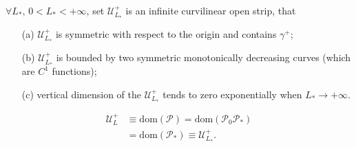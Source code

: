 \documentclass [10pt] {beamer}
\begin{document}
\begin{frame}
\begin{columns}[T]
\begin{column}{.5\textwidth}
			\begin{theorem}
				$\forall L_*, \, 0 < L_* < +\infty$, set $\mathscr{U}_{L_*}^+$ is an infinite curvilinear open strip, that
				\begin{enumerate}
					\item[(a)] $\mathscr{U}_{L_*}^+$ is symmetric with respect to the origin and contains $\gamma^+$;
					\item[(b)] $\mathscr{U}_{L_*}^+$ is bounded by two symmetric monotonically decreasing curves (which are $C^1$ functions);
					\item[(c)] vertical dimension of the $\mathscr{U}_{L_*}^+$ tends to zero exponentially when $L_* \to +\infty$.
				\end{enumerate}
			\end{theorem}
			\begin{align*}
				\mathscr{U}_L^+ & \equiv \textrm{dom}(\mathcal{P}) = \textrm{dom}(\mathcal{P}_0 \mathcal{P}_*) \\
				& = \textrm{dom}(\mathcal{P}_*) \equiv \mathscr{U}_{L_*}^+.
			\end{align*}
		\end{column}
	\end{columns}
\end{frame}
\end{document}
